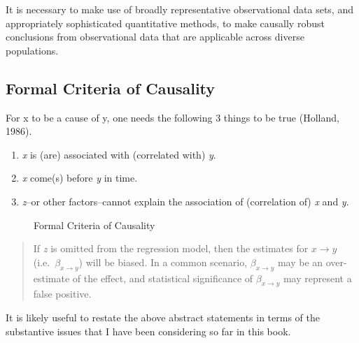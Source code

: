 \documentclass[
  letterpaper,
  DIV=11,
  numbers=noendperiod]{scrreprt}
\providecommand{\tightlist}{%
  \setlength{\itemsep}{0pt}\setlength{\parskip}{0pt}}\usepackage{longtable,booktabs,array}
\begin{document}
It is necessary to make use of broadly representative observational data
sets, and appropriately sophisticated quantitative methods, to make
causally robust conclusions from observational data that are applicable
across diverse populations.

\subsection{Formal Criteria of
Causality}\label{formal-criteria-of-causality}

For x to be a cause of y, one needs the following 3 things to be true
(Holland, 1986).

\begin{enumerate}
\def\labelenumi{\arabic{enumi}.}
\tightlist
\item
  \emph{x} is (are) associated with (correlated with) \emph{y}.
\item
  \emph{x} come(s) before \emph{y} in time.
\item
  \emph{z}--or other factors--cannot explain the association of
  (correlation of) \emph{x} and \emph{y}.
\end{enumerate}

\begin{figure}


\caption{\label{fig-causality}Formal Criteria of Causality}

\end{figure}%

\begin{quote}
If \emph{z} is omitted from the regression model, then the estimates for
\(x \rightarrow y\) (i.e.~\(\beta_{x \rightarrow y}\)) will be biased.
In a common scenario, \(\beta_{x \rightarrow y}\) may be an
over-estimate of the effect, and statistical significance of
\(\beta_{x \rightarrow y}\) may represent a false positive.
\end{quote}

It is likely useful to restate the above abstract statements in terms of
the substantive issues that I have been considering so far in this book.
\end{document}
